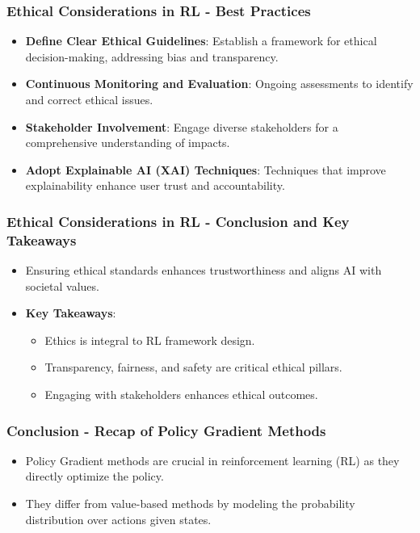 \documentclass[aspectratio=169]{beamer}
\begin{document}
\begin{frame}[fragile]
    \frametitle{Ethical Considerations in RL - Best Practices}
    \begin{itemize}
        \item \textbf{Define Clear Ethical Guidelines}: Establish a framework for ethical decision-making, addressing bias and transparency.
        \item \textbf{Continuous Monitoring and Evaluation}: Ongoing assessments to identify and correct ethical issues.
        \item \textbf{Stakeholder Involvement}: Engage diverse stakeholders for a comprehensive understanding of impacts.
        \item \textbf{Adopt Explainable AI (XAI) Techniques}: Techniques that improve explainability enhance user trust and accountability.
    \end{itemize}
\end{frame}

\begin{frame}[fragile]
    \frametitle{Ethical Considerations in RL - Conclusion and Key Takeaways}
    \begin{itemize}
        \item Ensuring ethical standards enhances trustworthiness and aligns AI with societal values.
        \item \textbf{Key Takeaways}:
            \begin{itemize}
                \item Ethics is integral to RL framework design.
                \item Transparency, fairness, and safety are critical ethical pillars.
                \item Engaging with stakeholders enhances ethical outcomes.
            \end{itemize}
    \end{itemize}
\end{frame}

\begin{frame}[fragile]
    \frametitle{Conclusion - Recap of Policy Gradient Methods}
    
    \begin{itemize}
        \item Policy Gradient methods are crucial in reinforcement learning (RL) as they directly optimize the policy.
        \item They differ from value-based methods by modeling the probability distribution over actions given states.
    \end{itemize}
\end{frame}
\end{document}
